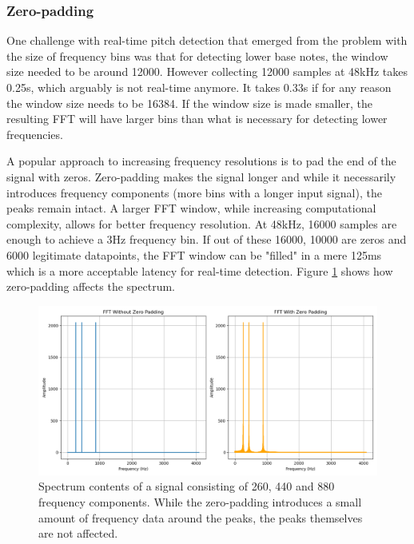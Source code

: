 \subsubsection{Zero-padding}
One challenge with real-time pitch detection that emerged from the problem with the size of frequency bins was that for detecting lower base notes, the window size needed to be around 12000. However collecting 12000 samples at 48kHz takes 0.25s, which arguably is not real-time anymore. It takes 0.33s if for any reason the window size needs to be 16384. If the window size is made smaller, the resulting FFT will have larger bins than what is necessary for detecting lower frequencies. 

A popular approach to increasing frequency resolutions is to pad the end of the signal with zeros. Zero-padding makes the signal longer and while it necessarily introduces frequency components (more bins with a longer input signal), the peaks remain intact. A larger FFT window, while increasing computational complexity, allows for better frequency resolution. At 48kHz, 16000 samples are enough to achieve a 3Hz frequency bin. If out of these 16000, 10000 are zeros and 6000 legitimate datapoints, the FFT window can be "filled" in a mere 125ms which is a more acceptable latency for real-time detection. Figure \ref{fig:zeropadSpectrum} shows how zero-padding affects the spectrum.

\begin{figure}[ht]
    \centering
    \includegraphics[width=\textwidth]{./images/zero_pad_spectrum.png}
    \caption{Spectrum contents of a signal consisting of 260, 440 and 880 frequency components. While the zero-padding introduces a small amount of frequency data around the peaks, the peaks themselves are not affected. \label{fig:zeropadSpectrum}}
\end{figure}

